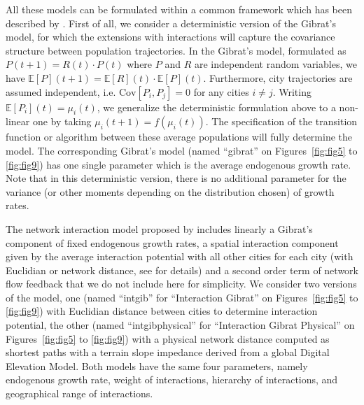 \documentclass[11pt]{article}
\begin{document}
All these models can be formulated within a common framework which has been described by \cite{raimbault2020indirect}. First of all, we consider a deterministic version of the Gibrat's model, for which the extensions with interactions will capture the covariance structure between population trajectories. In the Gibrat's model, formulated as $P(t+1) = R(t) \cdot P(t)$ where $P$ and $R$ are independent random variables, we have $\mathbb{E}\left[P\right](t+1) = \mathbb{E}\left[R\right](t) \cdot \mathbb{E}\left[P\right](t)$. Furthermore, city trajectories are assumed independent, i.e. $\textrm{Cov}\left[P_i,P_j\right] = 0$ for any cities $i \neq j$. Writing $\mathbb{E}\left[P_i\right](t) = \mu_i(t)$, we generalize the deterministic formulation above to a non-linear one by taking $\mu_i(t+1) = f(\mu_i(t))$. The specification of the transition function or algorithm between these average populations will fully determine the model. The corresponding Gibrat's model (named ``gibrat'' on Figures~\ref{fig:fig5} to \ref{fig:fig9}) has one single parameter which is the average endogenous growth rate. Note that in this deterministic version, there is no additional parameter for the variance (or other moments depending on the distribution chosen) of growth rates.

The network interaction model proposed by \cite{raimbault2020indirect} includes linearly a Gibrat's component of fixed endogenous growth rates, a spatial interaction component given by the average interaction potential with all other cities for each city (with Euclidian or network distance, see \cite{raimbault2020indirect} for details) and a second order term of network flow feedback that we do not include here for simplicity. We consider two versions of the model, one (named ``intgib'' for ``Interaction Gibrat'' on Figures~\ref{fig:fig5} to \ref{fig:fig9}) with Euclidian distance between cities to determine interaction potential, the other (named ``intgibphysical'' for ``Interaction Gibrat Physical'' on Figures~\ref{fig:fig5} to \ref{fig:fig9}) with a physical network distance computed as shortest paths with a terrain slope impedance derived from a global Digital Elevation Model. Both models have the same four parameters, namely endogenous growth rate, weight of interactions, hierarchy of interactions, and geographical range of interactions.
\end{document}
